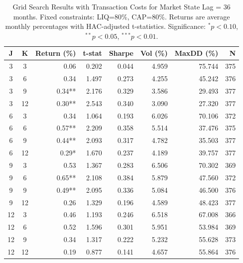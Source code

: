 \begin{table}[htbp]
\caption{Grid Search Results with Transaction Costs for Market State Lag = 36 months. Fixed constraints: LIQ=80\%, CAP=80\%. Returns are average monthly percentages with HAC-adjusted t-statistics. Significance: $^{*}p<0.10$, $^{**}p<0.05$, $^{***}p<0.01$.}
\label{tab:grid_costs_lag36}
\begin{tabular}{cc|rrrrrr}
\toprule
J & K & Return (\%) & t-stat & Sharpe & Vol (\%) & MaxDD (\%) & N \\
\midrule
3 & 3 & 0.06 & 0.202 & 0.044 & 4.959 & 75.744 & 375 \\
3 & 6 & 0.34 & 1.497 & 0.273 & 4.255 & 45.242 & 376 \\
3 & 9 & 0.34** & 2.176 & 0.329 & 3.586 & 29.493 & 377 \\
3 & 12 & 0.30** & 2.543 & 0.340 & 3.090 & 27.320 & 377 \\
6 & 3 & 0.34 & 1.064 & 0.193 & 6.026 & 70.106 & 372 \\
6 & 6 & 0.57** & 2.209 & 0.358 & 5.514 & 37.476 & 375 \\
6 & 9 & 0.44** & 2.093 & 0.317 & 4.782 & 35.503 & 377 \\
6 & 12 & 0.29* & 1.670 & 0.237 & 4.189 & 39.757 & 377 \\
9 & 3 & 0.53 & 1.367 & 0.283 & 6.506 & 70.302 & 369 \\
9 & 6 & 0.65** & 2.108 & 0.384 & 5.879 & 47.560 & 372 \\
9 & 9 & 0.49** & 2.095 & 0.336 & 5.084 & 46.500 & 376 \\
9 & 12 & 0.26 & 1.329 & 0.196 & 4.589 & 48.423 & 377 \\
12 & 3 & 0.46 & 1.193 & 0.246 & 6.518 & 67.008 & 366 \\
12 & 6 & 0.52 & 1.596 & 0.301 & 5.951 & 53.984 & 369 \\
12 & 9 & 0.34 & 1.317 & 0.222 & 5.232 & 55.628 & 373 \\
12 & 12 & 0.19 & 0.877 & 0.141 & 4.657 & 55.864 & 376 \\
\bottomrule
\end{tabular}
\end{table}
